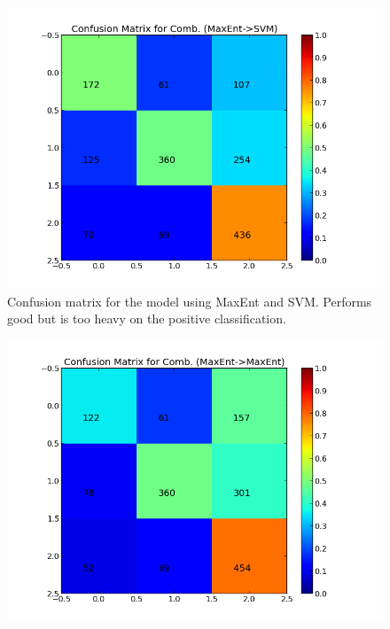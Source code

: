      
\begin{minipage}[htb!]{\linewidth}
     \centering
     \begin{minipage}{0.45\linewidth}
          \begin{figure}[H]
               \includegraphics[width=\linewidth]{../img/plots/grid/confusion_matrix_Comb-MaxEnt-SVM.png}
           \caption[Plot showing the confusion matrix for two-step MaxEnt -> SVM]{Confusion matrix for the model using MaxEnt and SVM. Performs good but is too heavy on the positive classification.}
           \label{fig:confmat_maxent_svm}
          \end{figure}
     \end{minipage}
     \hspace{0.05\linewidth}
     \begin{minipage}{0.45\linewidth}
          \begin{figure}[H]
               \includegraphics[width=\linewidth]{../img/plots/grid/confusion_matrix_Comb-MaxEnt-MaxEnt.png}

\end{figure}
\end{minipage}
\end{minipage}
